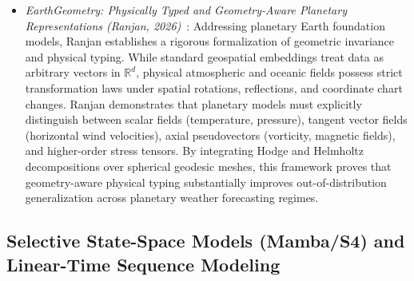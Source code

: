\begin{itemize}[leftmargin=*]
    \item \emph{EarthGeometry: Physically Typed and Geometry-Aware Planetary Representations (Ranjan, 2026)}~\cite{ranjan2026earthgeometry}: Addressing planetary Earth foundation models, Ranjan establishes a rigorous formalization of geometric invariance and physical typing. While standard geospatial embeddings treat data as arbitrary vectors in $\mathbb{R}^d$, physical atmospheric and oceanic fields possess strict transformation laws under spatial rotations, reflections, and coordinate chart changes. Ranjan demonstrates that planetary models must explicitly distinguish between scalar fields (temperature, pressure), tangent vector fields (horizontal wind velocities), axial pseudovectors (vorticity, magnetic fields), and higher-order stress tensors. By integrating Hodge and Helmholtz decompositions over spherical geodesic meshes, this framework proves that geometry-aware physical typing substantially improves out-of-distribution generalization across planetary weather forecasting regimes.
\end{itemize}

\subsection{Selective State-Space Models (Mamba/S4) and Linear-Time Sequence Modeling}
\label{sec:ssm_mamba_foundations}

